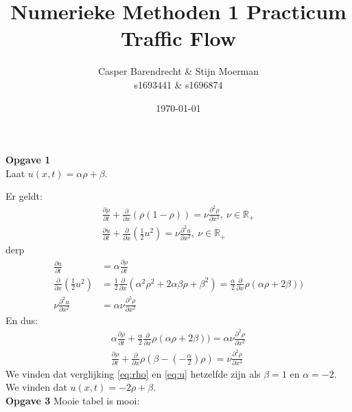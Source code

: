 \documentclass{article}
\title{Numerieke Methoden 1 Practicum Traffic Flow}
\author{Casper Barendrecht \& Stijn Moerman\\ s1693441 \& s1696874}
\date{\today}
\begin{document}
\maketitle



\textbf{Opgave 1}\\
Laat \(u(x,t)=\alpha\rho + \beta\).

Er geldt:
\begin{align}
	\frac{\partial \rho}{\partial t}+\frac{\partial}{\partial x}(\rho(1-\rho))=\nu \frac{\partial^2 \rho}{\partial x^2},~\nu\in \mathbb{R}_+ \label{eq:rho}\\
 \frac{\partial u}{\partial t}+\frac{\partial}{\partial x}\left(\frac{1}{2}u^2\right) = \nu \frac{\partial^2 u}{\partial x^2},~\nu\in \mathbb{R}_+\label{eq:u}
\end{align}
derp
\begin{align*}
 \frac{\partial u}{\partial t} &=\alpha\frac{\partial \rho}{\partial t}\\
\frac{\partial}{\partial x}\left(\frac{1}{2}u^2\right)&=\frac{1}{2}\frac{\partial}{\partial x}(\alpha^2\rho^2 +2\alpha\beta\rho+\beta^2)= \frac{\alpha}{2}\frac{\partial}{\partial x}\rho(\alpha\rho+2\beta))\\
\nu \frac{\partial^2 u}{\partial x^2}&=\alpha \nu\frac{\partial^2 \rho}{\partial x^2}
\end{align*}
En dus:
\begin{align*}
	\alpha\frac{\partial \rho}{\partial t}+\frac{\alpha}{2}\frac{\partial}{\partial x}\rho(\alpha\rho+2\beta))=\alpha \nu\frac{\partial^2 \rho}{\partial x^2}\\
		\frac{\partial \rho}{\partial t}+\frac{\partial}{\partial x}\rho(\beta-(-\frac{\alpha}{2})\rho)=\nu\frac{\partial^2 \rho}{\partial x^2}
\end{align*}
We vinden dat verglijking \eqref{eq:rho} en \eqref{eq:u} hetzelfde zijn als \(\beta=1\) en \(\alpha=-2\). We vinden dat \(u(x,t)=-2\rho+\beta\).\\

\textbf{Opgave 3}
Mooie tabel is mooi:
\end{document}
